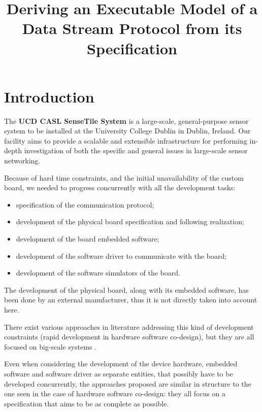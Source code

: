 \documentclass{article} \usepackage{times}
\begin{document}
\title{Deriving an Executable Model of a Data Stream Protocol from its
  Specification}

\maketitle


\section{Introduction}
\label{sec:introduction}

The \textbf{UCD CASL SenseTile System} is a large-scale,
general-purpose sensor system to be installed at the University
College Dublin in Dublin, Ireland.  Our facility aims to provide a
scalable and extensible infrastructure for performing in-depth
investigation of both the specific and general issues in large-scale
sensor networking.

Because of hard time constraints, and the initial unavailability of
the custom board, we needed to progress concurrently with all the
development tasks:

\begin{itemize}
\item specification of the communication protocol;
\item development of the physical board specification and following
  realization;
\item development of the board embedded software;
\item development of the software driver to communicate with the
  board;
\item development of the software simulators of the board.
\end{itemize}

The development of the physical board, along with its embedded
software, has been done by an external manufacturer, thus it is not
directly taken into account here.

There exist various approaches in literature addressing this kind of
development constraints (rapid development in hardware software
co-design), but they are all focused on big-scale systems
\cite{Slomka2000,Hoffman2001}.

Even when considering the development of the device hardware, embedded
software and software driver as separate entities, that possibly have
to be developed concurrently, the approaches proposed are similar in
structure to the one seen in the case of hardware software
co-design\cite{Valderrama1995,Siegmund2002,Ryzhyk2009}: they all focus
on a specification that aims to be as complete as possible.
\end{document}
